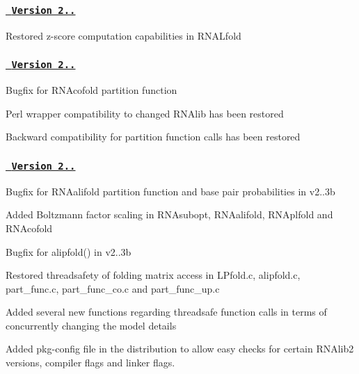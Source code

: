 \subsubsection*{\href{https://github.com/ViennaRNA/ViennaRNA/compare/v2.0.4...v2.0.5}{\texttt{ Version 2..}}}


\begin{DoxyItemize}
\item Restored z-\/score computation capabilities in R\+N\+A\+Lfold
\end{DoxyItemize}

\subsubsection*{\href{https://github.com/ViennaRNA/ViennaRNA/compare/v2.0.3...v2.0.4}{\texttt{ Version 2..}}}


\begin{DoxyItemize}
\item Bugfix for R\+N\+Acofold partition function
\item Perl wrapper compatibility to changed R\+N\+Alib has been restored
\item Backward compatibility for partition function calls has been restored
\end{DoxyItemize}

\subsubsection*{\href{https://github.com/ViennaRNA/ViennaRNA/compare/v2.0.2...v2.0.3}{\texttt{ Version 2..}}}


\begin{DoxyItemize}
\item Bugfix for R\+N\+Aalifold partition function and base pair probabilities in v2..\+3b
\item Added Boltzmann factor scaling in R\+N\+Asubopt, R\+N\+Aalifold, R\+N\+Aplfold and R\+N\+Acofold
\item Bugfix for alipfold() in v2..\+3b
\item Restored threadsafety of folding matrix access in L\+Pfold.\+c, alipfold.\+c, part\+\_\+func.\+c, part\+\_\+func\+\_\+co.\+c and part\+\_\+func\+\_\+up.\+c
\item Added several new functions regarding threadsafe function calls in terms of concurrently changing the model details
\item Added pkg-\/config file in the distribution to allow easy checks for certain R\+N\+Alib2 versions, compiler flags and linker flags.
\end{DoxyItemize}

